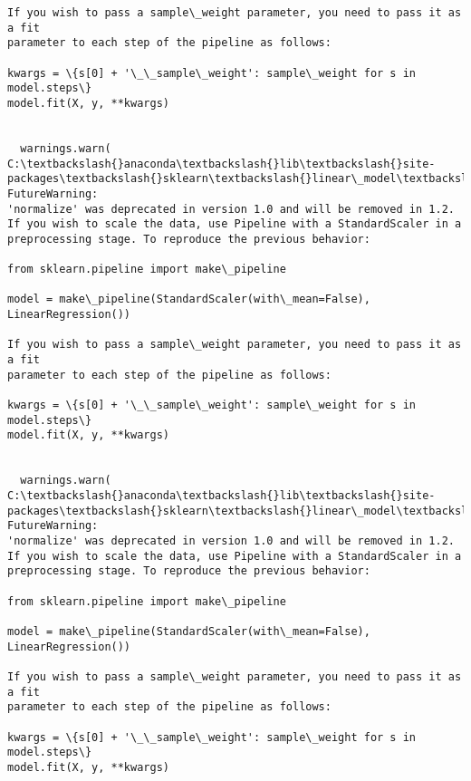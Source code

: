 \documentclass[11pt]{article}
\begin{document}
\begin{Verbatim}[commandchars=\\\{\}]
If you wish to pass a sample\_weight parameter, you need to pass it as a fit
parameter to each step of the pipeline as follows:

kwargs = \{s[0] + '\_\_sample\_weight': sample\_weight for s in model.steps\}
model.fit(X, y, **kwargs)


  warnings.warn(
C:\textbackslash{}anaconda\textbackslash{}lib\textbackslash{}site-packages\textbackslash{}sklearn\textbackslash{}linear\_model\textbackslash{}\_base.py:141: FutureWarning:
'normalize' was deprecated in version 1.0 and will be removed in 1.2.
If you wish to scale the data, use Pipeline with a StandardScaler in a
preprocessing stage. To reproduce the previous behavior:

from sklearn.pipeline import make\_pipeline

model = make\_pipeline(StandardScaler(with\_mean=False), LinearRegression())

If you wish to pass a sample\_weight parameter, you need to pass it as a fit
parameter to each step of the pipeline as follows:

kwargs = \{s[0] + '\_\_sample\_weight': sample\_weight for s in model.steps\}
model.fit(X, y, **kwargs)


  warnings.warn(
C:\textbackslash{}anaconda\textbackslash{}lib\textbackslash{}site-packages\textbackslash{}sklearn\textbackslash{}linear\_model\textbackslash{}\_base.py:141: FutureWarning:
'normalize' was deprecated in version 1.0 and will be removed in 1.2.
If you wish to scale the data, use Pipeline with a StandardScaler in a
preprocessing stage. To reproduce the previous behavior:

from sklearn.pipeline import make\_pipeline

model = make\_pipeline(StandardScaler(with\_mean=False), LinearRegression())

If you wish to pass a sample\_weight parameter, you need to pass it as a fit
parameter to each step of the pipeline as follows:

kwargs = \{s[0] + '\_\_sample\_weight': sample\_weight for s in model.steps\}
model.fit(X, y, **kwargs)



\end{Verbatim}
\end{document}
